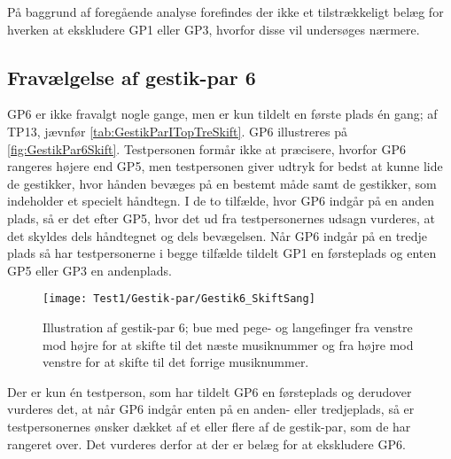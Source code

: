 På baggrund af foregående analyse forefindes der ikke et tilstrækkeligt belæg for hverken at ekskludere GP1 eller GP3, hvorfor disse vil undersøges nærmere. \blankline
%
\subsection{Fravælgelse af gestik-par 6}
\label{app:TestresultaterFravalgtGP6}
%
GP6 er ikke fravalgt nogle gange, men er kun tildelt en første plads én gang; af TP13, jævnfør \autoref{tab:GestikParITopTreSkift}. GP6 illustreres på \autoref{fig:GestikPar6Skift}. Testpersonen formår ikke at præcisere, hvorfor GP6 rangeres højere end GP5, men testpersonen giver udtryk for bedst at kunne lide de gestikker, hvor hånden bevæges på en bestemt måde samt de gestikker, som indeholder et specielt håndtegn. I de to tilfælde, hvor GP6 indgår på en anden plads, så er det efter GP5, hvor det ud fra testpersonernes udsagn vurderes, at det skyldes dels håndtegnet og dels bevægelsen. Når GP6 indgår på en tredje plads så har testpersonerne i begge tilfælde tildelt GP1 en førsteplads og enten GP5 eller GP3 en andenplads. 
%
\begin{figure}[H]
	\centering
	\texttt{[image: Test1/Gestik-par/Gestik6\_SkiftSang]}
	\caption{Illustration af gestik-par 6; bue med pege- og langefinger fra venstre mod højre for at skifte til det næste musiknummer og fra højre mod venstre for at skifte til det forrige musiknummer.}
	\label{fig:GestikPar6Skift}
\end{figure}
\noindent
%                
Der er kun én testperson, som har tildelt GP6 en førsteplads og derudover vurderes det, at når GP6 indgår enten på en anden- eller tredjeplads, så er testpersonernes ønsker dækket af et eller flere af de gestik-par, som de har rangeret over. Det vurderes derfor at der er belæg for at ekskludere GP6.
%
